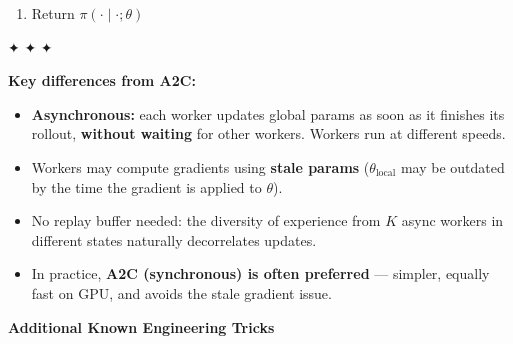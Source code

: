\documentclass[11pt]{article}
\providecommand{\tightlist}{%
      \setlength{\itemsep}{0pt}\setlength{\parskip}{0pt}}
\begin{document}
\begin{enumerate}
\begin{itemize}
\begin{itemize}
      \begin{itemize}
      \tightlist
      \item
        For \(i = n{-}1, \ldots, 0\):
        \(\quad R \leftarrow r_{i+1} + \gamma R\);
        \(\quad \mathrm{Adv}_i \leftarrow R - V(s_i;w_\text{local})\)
      \end{itemize}
    \item
      \textbf{Compute local gradients:}
      \[d\theta \leftarrow \nabla_{\theta_\text{local}}\!\left[-\sum_i \mathrm{Adv}_i \cdot \log\pi(a_i \mid s_i;\theta_\text{local}) \;-\; \beta\, H\!\bigl(\pi(\cdot \mid s_i;\theta_\text{local})\bigr)\right]\]
      \[dw \leftarrow \nabla_{w_\text{local}}\!\left[\sum_i \bigl(R - V(s_i;w_\text{local})\bigr)^2\right]\]
    \item
      \textbf{Async push to global params} \emph{(no lock --- atomic
      add)}:
      \[\theta \leftarrow \theta - \alpha_\theta\, d\theta, \qquad w \leftarrow w - \alpha_w\, dw\]
    \end{itemize}
  \item
    Until global step count reaches maximum
  \end{itemize}
\item
  Return \(\pi(\cdot \mid \cdot;\theta)\)
\end{enumerate}

✦ ✦ ✦

\textbf{Key differences from A2C:}

\begin{itemize}
\tightlist
\item
  \textbf{Asynchronous:} each worker updates global params as soon as it
  finishes its rollout, \textbf{without waiting} for other workers.
  Workers run at different speeds.
\item
  Workers may compute gradients using \textbf{stale params}
  (\(\theta_\text{local}\) may be outdated by the time the gradient is
  applied to \(\theta\)).
\item
  No replay buffer needed: the diversity of experience from \(K\) async
  workers in different states naturally decorrelates updates.
\item
  In practice, \textbf{A2C (synchronous) is often preferred} ---
  simpler, equally fast on GPU, and avoids the stale gradient issue.
\end{itemize}

    \label{tricks-4-4}

    \textbf{Additional Known Engineering Tricks}
\end{document}

